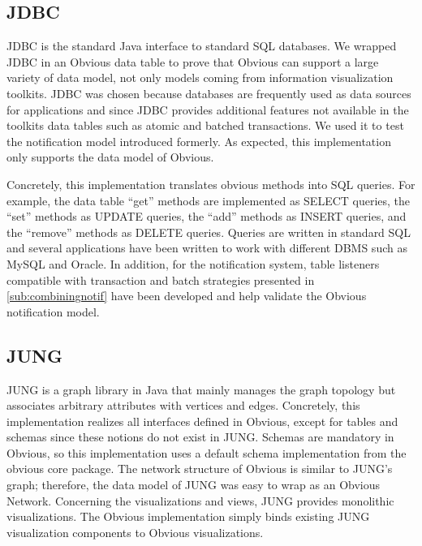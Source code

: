 
\subsection{JDBC}

JDBC is the standard Java interface to standard SQL databases.  We
wrapped JDBC in an Obvious data table to prove that Obvious can
support a large variety of data model, not only models coming from
information visualization toolkits.  JDBC was chosen because databases
are frequently used as data sources for applications and since JDBC
provides additional features not available in the toolkits data tables
such as atomic and batched transactions.  We used it to test the
notification model introduced formerly.  As expected, this
implementation only supports the data model of Obvious.

Concretely, this implementation translates obvious methods into SQL
queries.  For example, the data table ``get'' methods are implemented
as SELECT queries, the ``set'' methods as UPDATE queries, the ``add''
methods as INSERT queries, and the ``remove'' methods as DELETE
queries.  Queries are written in standard SQL and several applications
have been written to work with different DBMS such as MySQL and
Oracle.  In addition, for the notification system, table listeners
compatible with transaction and batch strategies presented in
\ref{sub:combiningnotif} have been developed and help validate the
Obvious notification model.


\subsection{JUNG}

JUNG is a graph library in Java that mainly manages the graph topology
but associates arbitrary attributes with vertices and edges.
Concretely, this implementation realizes all interfaces defined in
Obvious, except for tables and schemas since these notions do not
exist in JUNG.  Schemas are mandatory in Obvious, so this
implementation uses a default schema implementation from the obvious
core package.  The network structure of Obvious is similar to JUNG's
graph; therefore, the data model of JUNG was easy to wrap as an
Obvious Network.  Concerning the visualizations and views, JUNG
provides monolithic visualizations.  The Obvious implementation simply
binds existing JUNG visualization components to Obvious visualizations.


